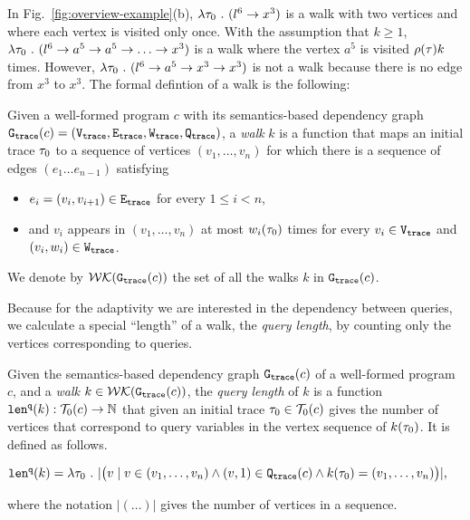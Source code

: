 In Fig.~\ref{fig:overview-example}(b), $\lambda \mathtt{\tau}_0 ~.~ (l^6 \to x^3)$ is a walk with two vertices and where each vertex is visited only once. 
With the assumption that $k \geq 1$, $\lambda \mathtt{\tau}_0 ~.~ (l^6 \to {a^5 \to a^5 \to \ldots} \to x^3)$ is a walk where the vertex $a^5$ is visited $\rho(\mathtt{\tau}) k$ times.
However, $\lambda \mathtt{\tau}_0 ~.~ (l^6 \to a^5 \to x^3 \to x^3)$ is not a walk because there is no edge from $x^3$ to $x^3$.
The formal defintion of a walk is the following:
\begin{defn}[Walk]
\label{def:finitewalk}
Given a well-formed program $c$ with its semantics-based dependency graph $\mathtt{{G_{trace}}}({c}) = (\mathtt{{V_{trace}}}, \mathtt{{E_{trace}}}, \mathtt{{W_{trace}}}, \mathtt{{Q_{trace}}})$, a \emph{walk} $k$ is a function that maps an initial trace $\mathtt{\tau}_0$ to a sequence of vertices $(v_1, \ldots, v_{n})$
for which there is a sequence of edges $(e_1 \ldots e_{n - 1})$  satisfying
\begin{itemize}
\item $e_i = (v_{i},v_{i + 1}) \in \mathtt{{E_{trace}}}$ for every $1 \leq i < n$,
\item and $v_i$ appears in $(v_1, \ldots, v_{n})$ at most $w_i(\mathtt{\tau}_0)$ times for every $v_i \in \mathtt{{V_{trace}}}$ and $(v_i, w_i) \in \mathtt{{W_{trace}}}$.  
\end{itemize}
We denote by $\mathcal{WK}(\mathtt{{G_{trace}}}(c))$
the set of all the walks $k$ in $\mathtt{{G_{trace}}}(c)$.
\end{defn} 
Because for the adaptivity
we are interested in the dependency between queries,
we calculate a special ``length'' of a walk, the \emph{query length},  by counting only the vertices
corresponding to queries.
\begin{defn}
\label{def:qlen}
Given 
the semantics-based dependency graph $\mathtt{{G_{trace}}}({c})$ of a well-formed program $c$,
 and a \emph{walk} 
 $k \in \mathcal{WK}(\mathtt{{G_{trace}}}(c))$, 
the \emph{query length} of $k$ is a function $\mathtt{len}^{\tt q}(k):\mathcal{T}_0(c) \to \mathbb{N}$ that 
given an initial trace $\mathtt{\tau}_0\in \mathcal{T}_0(c)$ 
gives
the number of vertices that correspond to query variables in the vertex sequence of $k(\mathtt{\tau}_0)$.
It is defined as follows.
\begin{center}
   $
  \mathtt{len}^{\tt q}(k) = \lambda \mathtt{\tau}_0 ~.~ |\big( v \mid v \in (v_1, \ldots, v_{n}) \land (v, 1) \in \mathtt{{Q_{trace}}}(c) 
  \land k(\mathtt{\tau}_0) = (v_1, \ldots, v_{n}) \big)|,
$
\end{center}
where the notation $| (\ldots) |$ gives the number of vertices in a sequence.
\end{defn}

